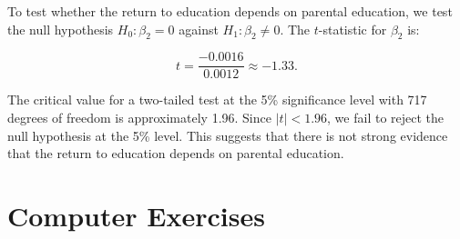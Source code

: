 \documentclass[12pt]{article}
\begin{document}
\begin{enumerate}
{\begin{enumerate}
To test whether the return to education depends on parental education, we test the null hypothesis \( H_0: \beta_2 = 0 \) against \( H_1: \beta_2 \neq 0 \). The \( t \)-statistic for \( \beta_2 \) is:

\[
t = \frac{-0.0016}{0.0012} \approx -1.33.
\]

The critical value for a two-tailed test at the 5\% significance level with 717 degrees of freedom is approximately 1.96. Since \( |t| < 1.96 \), we fail to reject the null hypothesis at the 5\% level. This suggests that there is not strong evidence that the return to education depends on parental education.


\end{enumerate}
}

\end{enumerate}



\section*{Computer Exercises}
\end{document}
